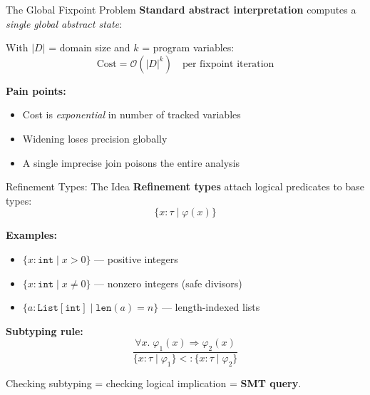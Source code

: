 \documentclass[aspectratio=169,10pt]{beamer}
\begin{document}
\begin{frame}{The Global Fixpoint Problem}
\textbf{Standard abstract interpretation} computes a \emph{single global abstract state}:

\begin{center}
\end{center}

With $|D|$ = domain size and $k$ = program variables:
\[
\text{Cost} = \mathcal{O}(|D|^k) \quad\text{per fixpoint iteration}
\]

\textbf{Pain points:}
\begin{itemize}
  \item Cost is \emph{exponential} in number of tracked variables
  \item Widening loses precision globally
  \item A single imprecise join poisons the entire analysis
\end{itemize}
\end{frame}

\begin{frame}{Refinement Types: The Idea}
\textbf{Refinement types} attach logical predicates to base types:
\[
\{x : \tau \mid \varphi(x)\}
\]

\textbf{Examples:}
\begin{itemize}
  \item $\{x : \texttt{int} \mid x > 0\}$ --- positive integers
  \item $\{x : \texttt{int} \mid x \neq 0\}$ --- nonzero integers (safe divisors)
  \item $\{a : \texttt{List}[\texttt{int}] \mid \texttt{len}(a) = n\}$ --- length-indexed lists
\end{itemize}

\vspace{0.3em}
\textbf{Subtyping rule:}
\[
\frac{\forall x.\; \varphi_1(x) \Rightarrow \varphi_2(x)}
     {\{x:\tau \mid \varphi_1\} <: \{x:\tau \mid \varphi_2\}}
\]

Checking subtyping = checking logical implication = \textbf{SMT query}.
\end{frame}
\end{document}
